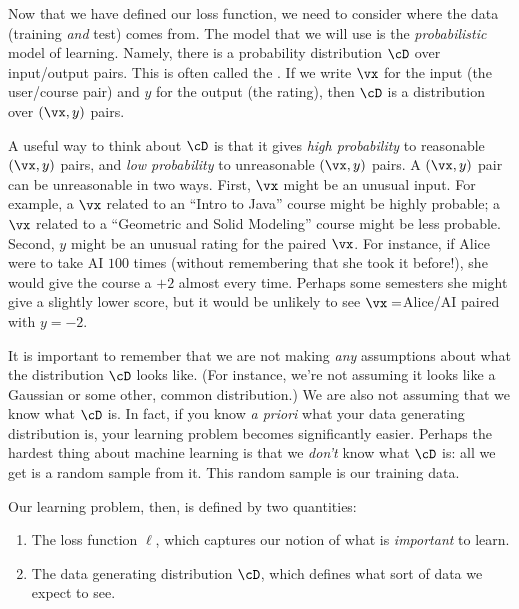 Now that we have defined our loss function, we need to consider where
the data (training \emph{and} test) comes from.  The model that we
will use is the \emph{probabilistic} model of learning.  Namely, there
is a probability distribution $\cD$ over input/output pairs.  This is
often called the .  If we write
$\vx$ for the input (the user/course pair) and $y$ for the output (the
rating), then $\cD$ is a distribution over $(\vx,y)$ pairs.

A useful way to think about $\cD$ is that it gives \emph{high
  probability} to reasonable $(\vx,y)$ pairs, and \emph{low
  probability} to unreasonable $(\vx,y)$ pairs.  A $(\vx,y)$ pair can
be unreasonable in two ways.  First, $\vx$ might be an unusual input.
For example, a $\vx$ related to an ``Intro to Java'' course might be
highly probable; a $\vx$ related to a ``Geometric and Solid Modeling''
course might be less probable.  Second, $y$ might be an unusual rating
for the paired $\vx$.  For instance, if Alice were to take AI $100$
times (without remembering that she took it before!), she would give
the course a $+2$ almost every time.  Perhaps some semesters she might
give a slightly lower score, but it would be unlikely to see
$\vx=$Alice/AI paired with $y=-2$.

It is important to remember that we are not making \emph{any}
assumptions about what the distribution $\cD$ looks like.  (For
instance, we're not assuming it looks like a Gaussian or some other,
common distribution.)  We are also not assuming that we know what
$\cD$ is.  In fact, if you know \emph{a priori} what your data
generating distribution is, your learning problem becomes
significantly easier.  Perhaps the hardest thing about machine
learning is that we \emph{don't} know what $\cD$ is: all we get is a
random sample from it.  This random sample is our training data.

Our learning problem, then, is defined by two quantities:

\begin{enumerate}
\item The loss function $\ell$, which captures our notion of what is
  \emph{important} to learn.

\item The data generating distribution $\cD$, which defines what sort
  of data we expect to see.
\end{enumerate}

